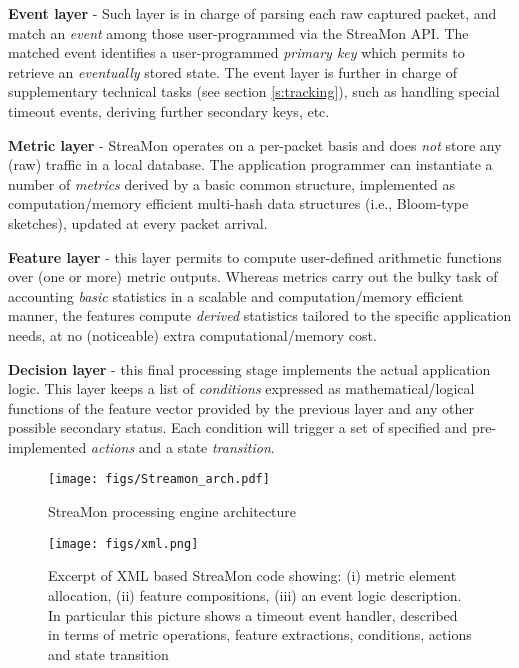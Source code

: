 \documentclass[conference,letterpaper]{sig-alternate-10pt}
\begin{document}
\textbf{Event layer} - Such layer is in charge of parsing each raw captured packet, and match an {\em event} among those user-programmed via the StreaMon API. The matched event identifies a user-programmed \textit{primary key} which permits to retrieve an {\em eventually} stored state. The event layer is further in charge of supplementary technical tasks (see section \ref{s:tracking}), such as handling special timeout events, deriving further secondary keys, etc.

\textbf{Metric layer} - StreaMon operates on a per-packet basis and does {\em not} store any (raw) traffic in a local database. The application programmer can instantiate a number of {\em metrics} derived by a basic common structure, implemented as computation/memory efficient multi-hash data structures (i.e., Bloom-type sketches), updated at every packet arrival. 

\textbf{Feature layer} - this layer permits to compute user-defined arithmetic functions over (one or more) metric outputs. Whereas metrics carry out the bulky task of accounting {\em basic} statistics in a scalable and computation/memory efficient manner, the features compute {\em derived} statistics tailored to the specific application needs, at no (noticeable) extra computational/memory cost.

\textbf{Decision layer} - this final processing stage implements the actual application logic. This layer keeps a list of \textit{conditions} expressed as mathematical/logical functions of the feature vector provided by the previous layer and any other possible secondary status. Each condition will trigger a set of specified and pre-implemented \textit{actions} and a state \textit{transition}.

\begin{figure}[!tb]
\centering
   \texttt{[image: figs/Streamon\_arch.pdf]}
\caption{StreaMon processing engine architecture}
\label{fig:arch_overview}
\vspace{-.5cm}
\end{figure}


\begin{figure}[t]
	\centering
	\texttt{[image: figs/xml.png]}
	\caption{Excerpt of XML based StreaMon code showing: (i) metric element allocation, (ii) feature compositions, (iii) an event logic description. In particular this picture shows a timeout event handler, described in terms of metric operations, feature extractions, conditions, actions and state transition}
	\label{fig:xml}
\end{figure}
\end{document}

